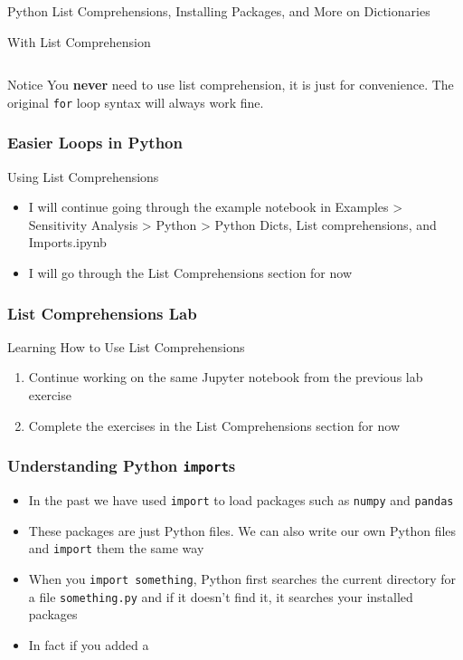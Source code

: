 \documentclass[handout, 11pt]{beamer}
\begin{document}
\begin{section}{Python List Comprehensions, Installing Packages, and More on Dictionaries}
\begin{frame}[fragile]
\begin{block}{With List Comprehension}
\begin{verbatim}
\end{verbatim}
\end{block}
\begin{block}{Notice}
You
\textbf{never}
need to use list comprehension, it is just for convenience. The original
\texttt{for}
loop syntax will always work fine.
\end{block}
\end{frame}
\begin{frame}
\frametitle{Easier Loops in Python}
{
\begin{block}{Using List Comprehensions}
\begin{itemize}
\item I will continue going through the example notebook in Examples > Sensitivity Analysis > Python > Python Dicts, List comprehensions, and Imports.ipynb
\item I will go through the List Comprehensions section for now
\end{itemize}
\end{block}
}
\end{frame}
\begin{frame}
\frametitle{List Comprehensions Lab}
{
\begin{block}{Learning How to Use List Comprehensions}
\begin{enumerate}
\item Continue working on the same Jupyter notebook from the previous lab exercise
\item Complete the exercises in the List Comprehensions section for now
\end{enumerate}
\vfill
\end{block}
}
\label{labs:list-comprehensions-lab-1}
\end{frame}
\begin{frame}
\frametitle{Understanding Python \texttt{import}s}
\begin{itemize}
\item In the past we have used
\texttt{import}
to load packages such as
\texttt{numpy}
and
\texttt{pandas}
\vfill
\item These packages are just Python files. We can also write our own Python files and
\texttt{import}
them the same way
\vfill
\item When you \texttt{import something}, Python first searches the current directory for a file
\texttt{something.py}
and if it doesn't find it, it searches your installed packages
\vfill
\item In fact if you added a

\end{itemize}
\end{frame}
\end{section}
\end{document}
